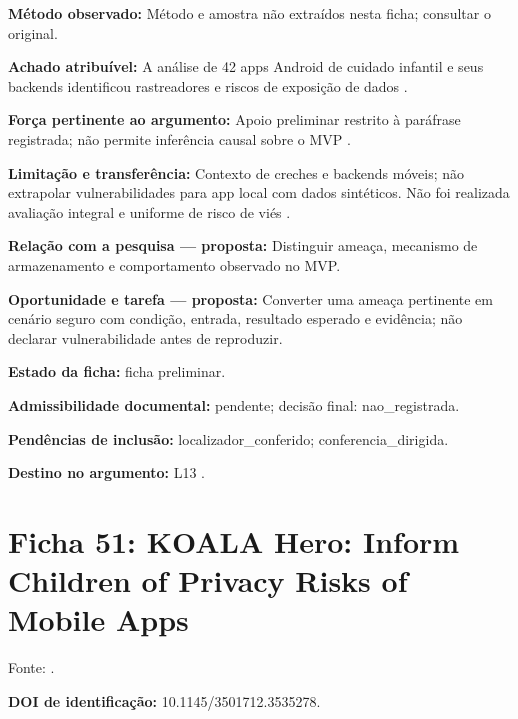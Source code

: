 \noindent\textbf{Método observado:} Método e amostra não extraídos nesta ficha; consultar o original.\par\medskip

\noindent\textbf{Achado atribuível:} A análise de 42 apps Android de cuidado infantil e seus backends identificou rastreadores e riscos de exposição de dados \citep{OS14}.\par\medskip

\noindent\textbf{Força pertinente ao argumento:} Apoio preliminar restrito à paráfrase registrada; não permite inferência causal sobre o MVP \citep{OS14}.\par\medskip

\noindent\textbf{Limitação e transferência:} Contexto de creches e backends móveis; não extrapolar vulnerabilidades para app local com dados sintéticos. Não foi realizada avaliação integral e uniforme de risco de viés \citep{OS14}.\par\medskip

\noindent\textbf{Relação com a pesquisa — proposta:} Distinguir ameaça, mecanismo de armazenamento e comportamento observado no MVP.\par\medskip

\noindent\textbf{Oportunidade e tarefa — proposta:} Converter uma ameaça pertinente em cenário seguro com condição, entrada, resultado esperado e evidência; não declarar vulnerabilidade antes de reproduzir.\par\medskip

\noindent\textbf{Estado da ficha:} ficha preliminar.\par\medskip

\noindent\textbf{Admissibilidade documental:} pendente; decisão final: nao\_registrada.\par\medskip

\noindent\textbf{Pendências de inclusão:} localizador\_conferido; conferencia\_dirigida.\par\medskip

\noindent\textbf{Destino no argumento:} L13 .

\clearpage\section*{Ficha 51: KOALA Hero: Inform Children of Privacy Risks of Mobile Apps}

Fonte: \citet{OS15}.

\noindent\textbf{DOI de identificação:} 10.1145/3501712.3535278.\par\medskip

